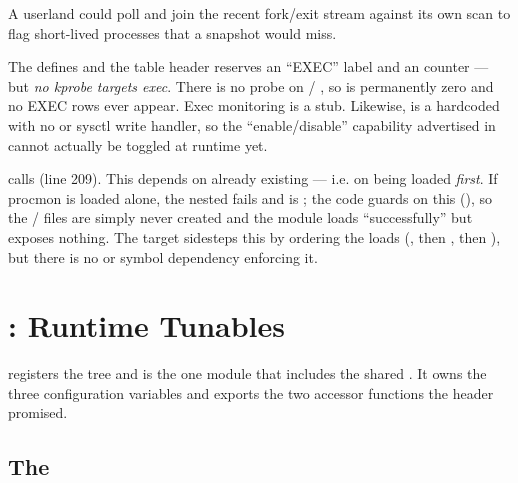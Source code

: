 A userland  could poll  and join the
recent fork/exit stream against its own  scan to flag
short-lived processes that a snapshot would miss.

\begin{notebox}
The  defines  and the table
header reserves an ``EXEC'' label and an 
counter — but \emph{no kprobe targets exec}. There is no probe on
 / , so  is permanently
zero and no EXEC rows ever appear. Exec monitoring is a stub. Likewise,
 is a hardcoded  with no
 or sysctl write handler, so the ``enable/disable'' capability
advertised in  cannot actually be toggled at runtime yet.
\end{notebox}

\begin{warnbox}
 calls
 (line 209). This depends on
 already existing — i.e. on  being
loaded \emph{first}. If procmon is loaded alone, the nested 
fails and  is ; the code guards on this
(), so the / files are simply
never created and the module loads ``successfully'' but exposes nothing. The
  target sidesteps this by ordering the loads
(, then , then ), but there is no
 or symbol dependency enforcing it.
\end{warnbox}

\section{: Runtime Tunables}

 registers the  tree and is the
one module that includes the shared . It owns the three
configuration variables and exports the two accessor functions the header
promised.

\subsection{The }

